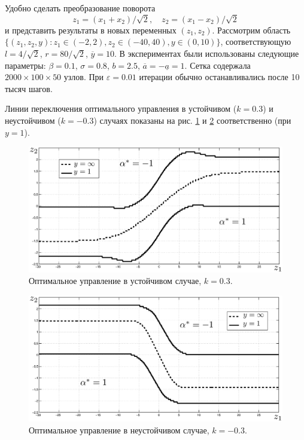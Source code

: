 \documentclass[twoside,12pt]{article}
\begin{document}
Удобно сделать преобразование поворота
$$z_1=(x_1+x_2)/\sqrt 2,\quad z_2=(x_1-x_2)/\sqrt 2$$
и представить результаты в новых переменных $(z_1,z_2)$. Рассмотрим область $\{(z_1,z_2,y):z_1\in (-2,2), z_2\in (-40,40), y\in(0,10)\}$, соответствующую $l=4/\sqrt 2$, $r=80/\sqrt 2$, $\overline y=10$. В экспериментах были использованы следующие параметры: $\beta=0.1$, $\sigma=0.8$, $b=2.5$, $\overline a=-\underline a=1$. Сетка содержала $2000\times 100\times 50$ узлов. При $\varepsilon=0.01$ итерации обычно останавливались после 10 тысяч шагов.


Линии переключения оптимального управления в устойчивом ($k=0.3$)  и неустойчивом ($k=-0.3$) случаях показаны на рис.
\ref{fig:2.4} и \ref{fig:2.5} соответственно (при $y=1$).
\begin{figure}[h]
        \centering
       \includegraphics[width=1\textwidth]{images/u5_plus.eps}
         \caption{Оптимальное управление в устойчивом случае, $k=0.3$.}
         \label{fig:2.4}
\end{figure}
\begin{figure}[h]
        \centering
       \includegraphics[width=1\textwidth]{images/u5_minus.eps}
         \caption{Оптимальное управление в неустойчивом случае, $k=-0.3$.}
         \label{fig:2.5}
\end{figure}
\end{document}
